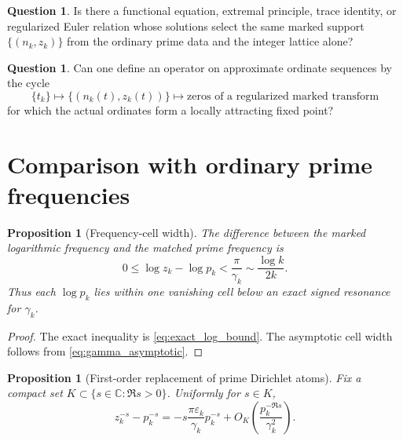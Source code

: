 \documentclass[11pt]{amsart}
\numberwithin{equation}{section}
\theoremstyle{plain}
\newtheorem{proposition}[theorem]{Proposition}
\theoremstyle{definition}
\newtheorem{question}[theorem]{Question}
\theoremstyle{remark}
\newcommand{\C}{\mathbb C}
\begin{document}
\begin{question}
\label{question:intrinsic_selector}
Is there a functional equation, extremal principle, trace identity, or
regularized Euler relation whose solutions select the same marked support
$\{(n_k,z_k)\}$ from the ordinary prime data and the integer lattice alone?
\end{question}

\begin{question}
\label{question:fixed_point_operator}
Can one define an operator on approximate ordinate sequences by the cycle
\begin{equation}
 \{t_k\}
 \longmapsto
 \{(n_k(t),z_k(t))\}
 \longmapsto
 \text{zeros of a regularized marked transform}
 \label{eq:fixed_point_cycle}
\end{equation}
for which the actual ordinates form a locally attracting fixed point?
\end{question}

\section{Comparison with ordinary prime frequencies}
\label{sec:comparison_prime_frequencies}

\begin{proposition}[Frequency-cell width]
\label{prop:frequency_cell_width}
The difference between the marked logarithmic frequency and the matched prime
frequency is
\begin{equation}
 0\leq\log z_k-\log p_k<\frac{\pi}{\gamma_k}
 \sim\frac{\log k}{2k}.
 \label{eq:frequency_cell_width_asymptotic}
\end{equation}
Thus each $\log p_k$ lies within one vanishing cell below an exact signed
resonance for $\gamma_k$.
\end{proposition}

\begin{proof}
The exact inequality is \eqref{eq:exact_log_bound}.  The asymptotic cell
width follows from \eqref{eq:gamma_asymptotic}.
\end{proof}

\begin{proposition}[First-order replacement of prime Dirichlet atoms]
\label{prop:first_order_dirichlet_replacement}
Fix a compact set $K\subset\{s\in\C:\Re s>0\}$.  Uniformly for $s\in K$,
\begin{equation}
 z_k^{-s}-p_k^{-s}
 =-s\frac{\pi\varepsilon_k}{\gamma_k}p_k^{-s}
 +O_K\left(\frac{p_k^{-\Re s}}{\gamma_k^2}\right).
 \label{eq:dirichlet_atom_expansion}
\end{equation}
\end{proposition}
\end{document}
